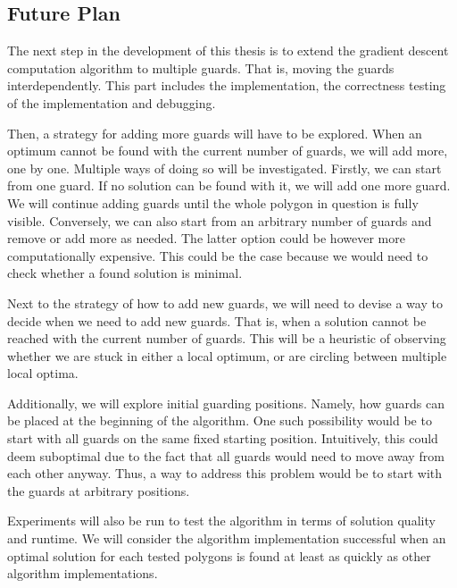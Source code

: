 \subsection{Future Plan}
The next step in the development of this thesis is to extend the gradient descent computation algorithm to multiple guards. That is, moving the guards interdependently. This part includes the implementation, the correctness testing of the implementation and debugging. 

Then, a strategy for adding more guards will have to be explored. When an optimum cannot be found with the current number of guards, we will add more, one by one. Multiple ways of doing so will be investigated. Firstly, we can start from one guard. If no solution can be found with it, we will add one more guard. We will continue adding guards until the whole polygon in question is fully visible. Conversely, we can also start from an arbitrary number of guards and remove or add more as needed. The latter option could be however more computationally expensive. This could be the case because we would need to check whether a found solution is minimal.

Next to the strategy of how to add new guards, we will need to devise a way to decide when we need to add new guards. That is, when a solution cannot be reached with the current number of guards. This will be a heuristic of observing whether we are stuck in either a local optimum, or are circling between multiple local optima.

Additionally, we will explore initial guarding positions. Namely, how guards can be placed at the beginning of the algorithm. One such possibility would be to start with all guards on the same fixed starting position. Intuitively, this could deem suboptimal due to the fact that all guards would need to move away from each other anyway. Thus, a way to address this problem would be to start with the guards at arbitrary positions.

Experiments will also be run to test the algorithm in terms of solution quality and runtime. We will consider the algorithm implementation successful when an optimal solution for each tested polygons is found at least as quickly as other algorithm implementations. 


